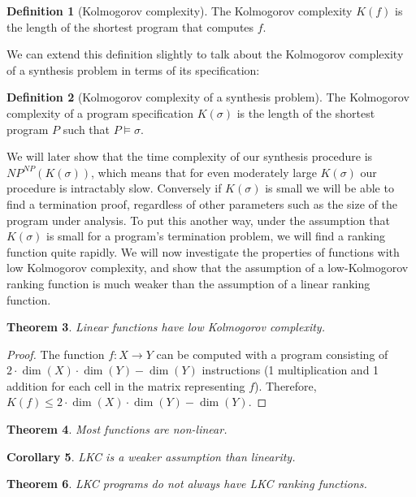 \documentclass[preprint]{sigplanconf}
\newtheorem{theorem}{Theorem}
\newtheorem{corollary}[theorem]{Corollary}
\theoremstyle{definition}
\newtheorem{definition}[theorem]{Definition}
\begin{document}
\begin{definition}[Kolmogorov complexity]
 The Kolmogorov complexity $K(f)$ is the length of the shortest program that
 computes $f$.
\end{definition}

We can extend this definition slightly to talk about the Kolmogorov complexity of a
synthesis problem in terms of its specification:

\begin{definition}[Kolmogorov complexity of a synthesis problem]
 The Kolmogorov complexity of a program specification $K(\sigma)$ is the length of the shortest
 program $P$ such that $P \models \sigma$.
\end{definition}

We will later show that the time complexity of our synthesis procedure is $NP^{NP}(K(\sigma))$,
which means that for even moderately large $K(\sigma)$ our procedure is intractably slow.  Conversely
if $K(\sigma)$ is small we will be able to find a termination proof, regardless of other parameters
such as the size of the program under analysis.  To put this another way, under the assumption
that $K(\sigma)$ is small for a program's termination problem, we will find a ranking function
quite rapidly.  We will now investigate the properties of functions with low Kolmogorov complexity,
and show that the assumption of a low-Kolmogorov ranking function is much weaker than the assumption
of a linear ranking function.


\begin{theorem}
 Linear functions have low Kolmogorov complexity.
\end{theorem}

\begin{proof}
 The function $f: X \to Y$ can be computed with a program consisting of
 $2 \cdot \dim(X) \cdot \dim(Y) - \dim(Y)$ instructions (1 multiplication and 1 addition for
 each cell in the matrix representing $f$).  Therefore,
 $K(f) \leq 2 \cdot \dim(X) \cdot \dim(Y) - \dim(Y)$.
\end{proof}

\begin{theorem}
 Most functions are non-linear.
\end{theorem}

\begin{corollary}
 LKC is a weaker assumption than linearity.
\end{corollary}


\begin{theorem}
 LKC programs do not always have LKC ranking functions.
\end{theorem}
\end{document}
